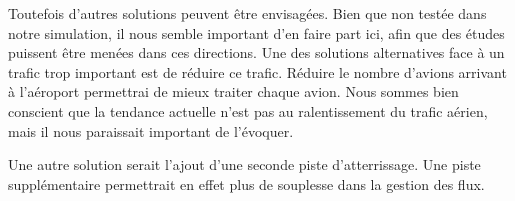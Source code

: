 Toutefois d'autres solutions peuvent être envisagées. Bien que non testée dans notre simulation, il nous semble important d'en faire part ici, afin que des études puissent être menées dans ces directions.
Une des solutions alternatives face à un trafic trop important est de réduire ce trafic. Réduire le nombre d'avions arrivant à l'aéroport permettrai de mieux traiter chaque avion. Nous sommes bien conscient que la tendance actuelle n'est pas au ralentissement du trafic aérien, mais il nous paraissait important de l'évoquer.

Une autre solution serait l'ajout d'une seconde piste d'atterrissage. Une piste supplémentaire permettrait en effet plus de souplesse dans la gestion des flux.





